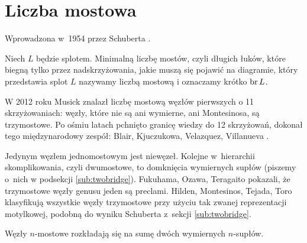 
\section{Liczba mostowa}
%

Wprowadzona w~1954 przez Schuberta \cite{schubert1954}.
%

\begin{definition}
    Niech $L$ będzie splotem.
    Minimalną liczbę mostów, czyli długich łuków, które biegną tylko przez nadskrzyżowania, jakie muszą się pojawić na diagramie, który przedstawia splot $L$ nazywamy liczbą mostową i oznaczamy krótko $\operatorname{br} L$.
\end{definition}

W 2012 roku Musick \cite{musick2012} znalazł liczbę mostową węzłów pierwszych o 11 skrzyżowaniach: węzły, które nie są ani wymierne, ani Montesinosa, są trzymostowe.
%
Po ośmiu latach pchnięto granicę wiedzy do 12 skrzyżowań, dokonał tego międzynarodowy zespół: Blair, Kjuczukowa, Velazquez, Villanueva \cite{blair2020}.
%
%
%
%

Jedynym węzłem jednomostowym jest niewęzeł.
Kolejne w~hierarchii skomplikowania, czyli dwumostowe, to domknięcia wymiernych supłów (piszemy o~nich w podsekcji \ref{sub:twobridge}).
Fukuhama, Ozawa, Teragaito \cite{fukuhama1999} pokazali, że trzymostowe węzły genusu jeden są preclami.
%
%
%
%
%
%
Hilden, Montesinos, Tejada, Toro \cite{hilden2012} klasyfikują wszystkie węzły trzymostowe przy użyciu tak zwanej reprezentacji motylkowej, podobną do wyniku Schuberta z~sekcji \ref{sub:twobridge}.
%
%
%
%
%
%
%

\begin{proposition}
    Węzły $n$-mostowe rozkładają się na sumę dwóch wymiernych $n$-supłów.
\end{proposition}
%

